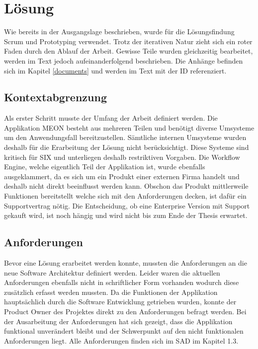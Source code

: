 \graphicspath{{./images/}}

\chapter{Lösung}

Wie bereits in der Ausgangslage beschrieben, wurde für die Lösungsfindung Scrum und Prototyping verwendet. Trotz der iterativen Natur zieht sich ein roter Faden durch den Ablauf der Arbeit. Gewisse Teile wurden gleichzeitig bearbeitet, werden im Text jedoch aufeinanderfolgend beschrieben. Die Anhänge befinden sich im Kapitel \ref{documents} und werden im Text mit der ID referenziert.

\section{Kontextabgrenzung}

Als erster Schritt musste der Umfang der Arbeit definiert werden. Die Applikation MEON besteht aus mehreren Teilen und benötigt diverse Umsysteme um den Anwendungsfall bereitzustellen. Sämtliche internen Umsysteme wurden deshalb für die Erarbeitung der Lösung nicht berücksichtigt. Diese Systeme sind kritisch für SIX und unterliegen deshalb restriktiven Vorgaben. Die Workflow Engine, welche eigentlich Teil der Applikation ist, wurde ebenfalls ausgeklammert, da es sich um ein Produkt einer externen Firma handelt und deshalb nicht direkt beeinflusst werden kann. Obschon das Produkt mittlerweile Funktionen bereitstellt welche sich mit den Anforderungen decken, ist dafür ein Supportvertrag nötig. Die Entscheidung, ob eine Enterprise Version mit Support gekauft wird, ist noch hängig und wird nicht bis zum Ende der Thesis erwartet.

\section{Anforderungen}

Bevor eine Lösung erarbeitet werden konnte, mussten die Anforderungen an die neue Software Architektur definiert werden. Leider waren die aktuellen Anforderungen ebenfalls nicht in schriftlicher Form vorhanden wodurch diese zusätzlich erfasst werden mussten. Da die Funktionen der Applikation hauptsächlich durch die Software Entwicklung getrieben wurden, konnte der Product Owner des Projektes direkt zu den Anforderungen befragt werden. Bei der Ausarbeitung der Anforderungen hat sich gezeigt, dass die Applikation funktional unverändert bleibt und der Schwerpunkt auf den nicht funktionalen Anforderungen liegt. Alle Anforderungen finden sich im SAD im Kapitel 1.3.

